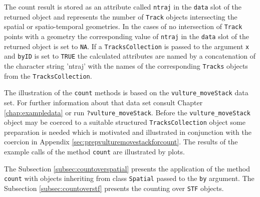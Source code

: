 \documentclass[12pt, oneside, a4paper]{scrbook}
\let\code=\texttt
\begin{document}
\par\medskip

The count result is stored as an attribute called \code{ntraj} in the \code{data} slot of the returned object and represents the number of \code{Track} objects intersecting the spatial or spatio-temporal geometries. In the cases of no intersection of \code{Track} points with a geometry the corresponding value of \code{ntraj} in the \code{data} slot of the returned object is set to \code{NA}. If a \code{TracksCollection} is passed to the argument \code{x} and \code{byID} is set to \code{TRUE} the calculated attributes are named by a concatenation of the character string 'ntraj' with the names of the corresponding \code{Tracks} objects from the \code{TracksCollection}.
\par\medskip

The illustration of the \code{count} methods is based on the \code{vulture\_moveStack} data set. For further information about that data set consult Chapter \ref{chap:exampledata} or run \code{?vulture\_moveStack}. Before the \code{vulture\_moveStack} object may be coerced to a suitable structured \code{TracksCollection} object some preparation is needed which is motivated and illustrated in conjunction with the coercion in Appendix \ref{sec:prepvulturemovestackforcount}.
The results of the example calls of the method \code{count} are illustrated by plots. 

\par\medskip

The Subsection \ref{subsec:countoverspatial} presents the application of the  method \code{count} with objects inheriting from class \code{Spatial} passed to the \code{by} argument.
The Subsection \ref{subsec:countoverstf} presents the counting over \code{STF} objects.
\par\medskip


\end{document}
